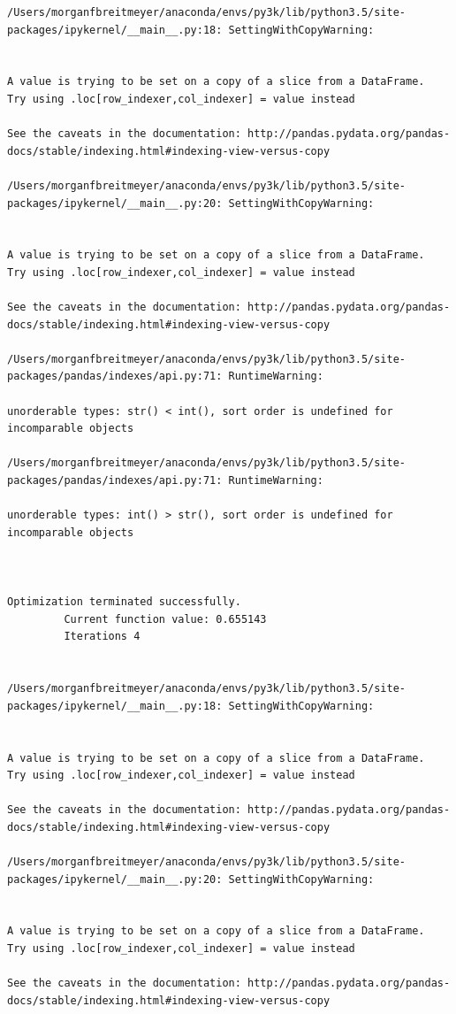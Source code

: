 \begin{lstlisting}
/Users/morganfbreitmeyer/anaconda/envs/py3k/lib/python3.5/site-packages/ipykernel/__main__.py:18: SettingWithCopyWarning:


A value is trying to be set on a copy of a slice from a DataFrame.
Try using .loc[row_indexer,col_indexer] = value instead

See the caveats in the documentation: http://pandas.pydata.org/pandas-docs/stable/indexing.html#indexing-view-versus-copy

/Users/morganfbreitmeyer/anaconda/envs/py3k/lib/python3.5/site-packages/ipykernel/__main__.py:20: SettingWithCopyWarning:


A value is trying to be set on a copy of a slice from a DataFrame.
Try using .loc[row_indexer,col_indexer] = value instead

See the caveats in the documentation: http://pandas.pydata.org/pandas-docs/stable/indexing.html#indexing-view-versus-copy

/Users/morganfbreitmeyer/anaconda/envs/py3k/lib/python3.5/site-packages/pandas/indexes/api.py:71: RuntimeWarning:

unorderable types: str() < int(), sort order is undefined for incomparable objects

/Users/morganfbreitmeyer/anaconda/envs/py3k/lib/python3.5/site-packages/pandas/indexes/api.py:71: RuntimeWarning:

unorderable types: int() > str(), sort order is undefined for incomparable objects



Optimization terminated successfully.
         Current function value: 0.655143
         Iterations 4


/Users/morganfbreitmeyer/anaconda/envs/py3k/lib/python3.5/site-packages/ipykernel/__main__.py:18: SettingWithCopyWarning:


A value is trying to be set on a copy of a slice from a DataFrame.
Try using .loc[row_indexer,col_indexer] = value instead

See the caveats in the documentation: http://pandas.pydata.org/pandas-docs/stable/indexing.html#indexing-view-versus-copy

/Users/morganfbreitmeyer/anaconda/envs/py3k/lib/python3.5/site-packages/ipykernel/__main__.py:20: SettingWithCopyWarning:


A value is trying to be set on a copy of a slice from a DataFrame.
Try using .loc[row_indexer,col_indexer] = value instead

See the caveats in the documentation: http://pandas.pydata.org/pandas-docs/stable/indexing.html#indexing-view-versus-copy


\end{lstlisting}
